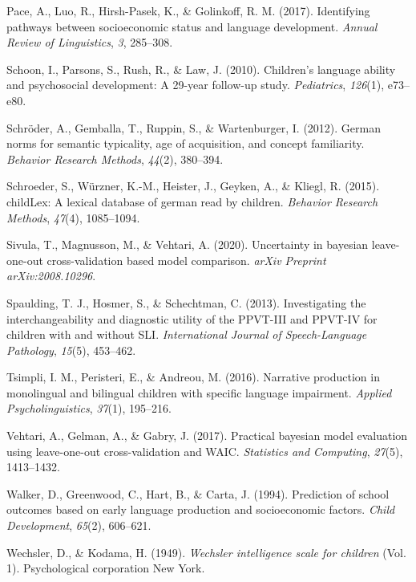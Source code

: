 \documentclass[
  man,floatsintext]{apa6}
\newlength{\cslhangindent}
\newlength{\cslentryspacingunit} %
\newenvironment{CSLReferences}[2] %
 {%
  \setlength{\parindent}{0pt}
  \ifodd #1
  \let\oldpar\par
  \def\par{\hangindent=\cslhangindent\oldpar}
  \fi
  \setlength{\parskip}{#2\cslentryspacingunit}
 }%
 {}
\begin{document}
\begin{CSLReferences}{1}{0}
\leavevmode{}%
Pace, A., Luo, R., Hirsh-Pasek, K., \& Golinkoff, R. M. (2017). Identifying pathways between socioeconomic status and language development. \emph{Annual Review of Linguistics}, \emph{3}, 285--308.

\leavevmode{}%
Schoon, I., Parsons, S., Rush, R., \& Law, J. (2010). Children's language ability and psychosocial development: A 29-year follow-up study. \emph{Pediatrics}, \emph{126}(1), e73--e80.

\leavevmode{}%
Schröder, A., Gemballa, T., Ruppin, S., \& Wartenburger, I. (2012). German norms for semantic typicality, age of acquisition, and concept familiarity. \emph{Behavior Research Methods}, \emph{44}(2), 380--394.

\leavevmode{}%
Schroeder, S., Würzner, K.-M., Heister, J., Geyken, A., \& Kliegl, R. (2015). childLex: A lexical database of german read by children. \emph{Behavior Research Methods}, \emph{47}(4), 1085--1094.

\leavevmode{}%
Sivula, T., Magnusson, M., \& Vehtari, A. (2020). Uncertainty in bayesian leave-one-out cross-validation based model comparison. \emph{arXiv Preprint arXiv:2008.10296}.

\leavevmode{}%
Spaulding, T. J., Hosmer, S., \& Schechtman, C. (2013). Investigating the interchangeability and diagnostic utility of the PPVT-III and PPVT-IV for children with and without SLI. \emph{International Journal of Speech-Language Pathology}, \emph{15}(5), 453--462.

\leavevmode{}%
Tsimpli, I. M., Peristeri, E., \& Andreou, M. (2016). Narrative production in monolingual and bilingual children with specific language impairment. \emph{Applied Psycholinguistics}, \emph{37}(1), 195--216.

\leavevmode{}%
Vehtari, A., Gelman, A., \& Gabry, J. (2017). Practical bayesian model evaluation using leave-one-out cross-validation and WAIC. \emph{Statistics and Computing}, \emph{27}(5), 1413--1432.

\leavevmode{}%
Walker, D., Greenwood, C., Hart, B., \& Carta, J. (1994). Prediction of school outcomes based on early language production and socioeconomic factors. \emph{Child Development}, \emph{65}(2), 606--621.

\leavevmode{}%
Wechsler, D., \& Kodama, H. (1949). \emph{Wechsler intelligence scale for children} (Vol. 1). Psychological corporation New York.

\end{CSLReferences}
\end{document}
